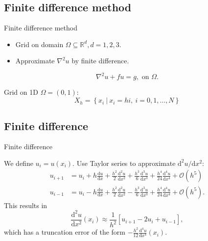 \documentclass[]{beamer}
\newcommand{\Reals}{\mathbb{R}}
\newcommand{\dd}{\mathrm{d}}
\begin{document}
\subsection{Finite difference method}

\begin{frame}{Finite difference method}
    
  \begin{itemize}
    \item Grid on domain $\Omega \subseteq \Reals^d, d = 1, 2, 3$.
    \item Approximate $\nabla^2 u$ by finite difference.
  \end{itemize}

  \begin{equation*}
    \nabla^2 u + f u = g, \text{ on } \Omega.
  \end{equation*}
    
  Grid on 1D $\Omega = (0, 1)$:
\begin{equation*}
  X_h = \left\{ x_i\ |\ x_i = h i,\ i = 0, 1, \ldots, N \right\}
\end{equation*}

\end{frame}

\subsection{Finite difference}

\begin{frame}{Finite difference}

We define $u_i = u(x_i)$. Use Taylor series to approximate $\dd^2 u / \dd x^2$:
\begin{align}
  u_{i + 1} & = u_{i} + h \frac{\dd u}{\dd x}
    + \frac{h^2}{2} \frac{\dd^2 u}{\dd x^2}
    + \frac{h^3}{6} \frac{\dd^3 u}{\dd x^3}
    + \frac{h^4}{24} \frac{\dd^4 u}{\dd x^4} 
    + \mathcal{O}(h^5) \\
%
  u_{i - 1} & = u_{i} - h \frac{\dd u}{\dd x}
    + \frac{h^2}{2} \frac{\dd^2 u}{\dd x^2}
    - \frac{h^3}{6} \frac{\dd^3 u}{\dd x^3}
    + \frac{h^4}{24} \frac{\dd^4 u}{\dd x^4}
    + \mathcal{O}(h^5).
\end{align}
This results in
\begin{equation}
  \frac{\dd^2 u}{\dd x^2}(x_i)
  \approx
    \frac{1}{h^2} \left[ u_{i + 1} - 2 u_i + u_{i - 1} \right],
\end{equation}
which has a truncation error of the form $ - \frac{h^2}{12} \frac{\dd^4 u}{\dd x^4}(x_i)$.

\end{frame}
\end{document}

